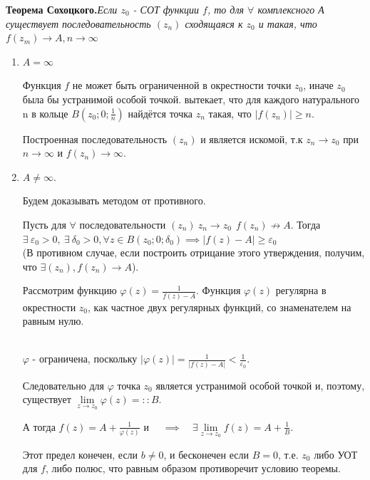 \documentclass[a4paper, 12pt]{report}
\begin{document}
	\par\bigskip 
	\textbf{Теорема Сохоцкого.}\quad \textit{Если $z_0$ - СОТ функции $f$, то для $\forall$ комплексного А существует последовательность $(z_n)$ сходящаяся к $z_0$ и такая, что $f(z_m) \to A, n \to \infty$}\\
	\blacklozenge \hspace{3 mm} \par
	\begin{enumerate}
	    \item $A =\infty$ \par Функция $f$ не может быть ограниченной в окрестности точки $z_0$, иначе $z_0$ была бы устранимой особой точкой. 
		 вытекает, что для каждого натурального n в кольце $B(z_0;0;\frac{1}{n})$ найдётся точка $z_n$ такая, что $|f(z_n)|\geq n$.\par Построенная последовательность $(z_n)$ и является искомой, т.к $z_n \to z_0$ при $n \to \infty$ и $f(z_n)\to \infty$.
		\item $A \neq \infty$.\par Будем доказывать методом от противного. \par Пусть для $\forall$ последовательности $(z_n) \ z_n \to z_0 \ \ f(z_n) \not \to A$. Тогда $\exists \ \varepsilon_0 > 0, \ \exists \ \delta_0 > 0, \forall z \in B(z_0; 0; \delta_0) \implies |f(z) - A| \geq \varepsilon_0$
		\\ (В противном случае, если построить отрицание этого утверждения, получим, что $\exists (z_n), f(z_n) \to A$).
		\par Рассмотрим функцию $\varphi (z) = \frac{1}{f(z) - A}$. Функция $\varphi(z)$ регулярна в окрестности $z_0$, как частное двух регулярных функций, со знаменателем на равным нулю.
		\par
		\\ $\varphi$ - ограничена, поскольку $|\varphi(z)| = \frac{1}{|f(z) - A|} < \frac{1}{\varepsilon_0}$.\par Следовательно для $\varphi$ точка $z_0$ является устранимой особой точкой и, поэтому, существует $\lim\limits_{z \to z_0} \varphi(z) = ::B$.\par А тогда $f(z) = A + \frac{1}{\varphi(z)}$ и $\quad \implies \quad \exists \lim\limits_{z \to z_0}f(z) = A + \frac{1}{B}$. \par Этот предел конечен, если $b \neq 0$, и бесконечен если $B = 0$, т.е. $z_0$ либо УОТ для $f$, либо полюс, что равным образом противоречит условию теоремы. \quad
	\blacksquare
	\end{enumerate}
	
\end{document}
